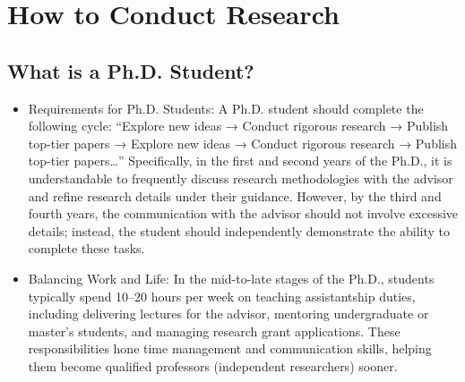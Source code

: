 \documentclass[conference]{IEEEtran}
\begin{document}
\section{How to Conduct Research}
\subsection{What is a Ph.D. Student?}\label{AA}
\begin{itemize}
\item Requirements for Ph.D. Students: A Ph.D. student should complete the following cycle: “Explore new ideas → Conduct rigorous research → Publish top-tier papers → Explore new ideas → Conduct rigorous research → Publish top-tier papers…” Specifically, in the first and second years of the Ph.D., it is understandable to frequently discuss research methodologies with the advisor and refine research details under their guidance. However, by the third and fourth years, the communication with the advisor should not involve excessive details; instead, the student should independently demonstrate the ability to complete these tasks.

\item Balancing Work and Life: In the mid-to-late stages of the Ph.D., students typically spend 10–20 hours per week on teaching assistantship duties, including delivering lectures for the advisor, mentoring undergraduate or master's students, and managing research grant applications. These responsibilities hone time management and communication skills, helping them become qualified professors (independent researchers) sooner.
\end{itemize}
\end{document}
